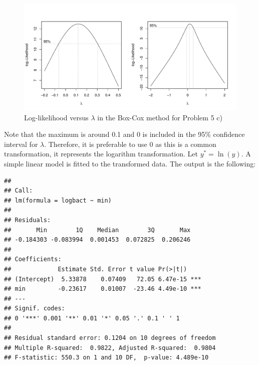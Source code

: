 \begin{solution}{2.22}
\begin{enumerate}
\begin{figure}
\begin{center}
\begin{knitrout}
\color{fgcolor}
\includegraphics[width=\maxwidth]{figure/unnamed-chunk-42-1}

\end{knitrout}
\end{center}
\caption{Log-likelihood versus $\lambda$ in the Box-Cox method for Problem 5 c)} \label{fig:simple:bact4}
\end{figure}

Note that the maximum is around 0.1 and 0 is included in the 95\% confidence interval for $\lambda$. Therefore, it is preferable to use 0 as this is a common transformation, it represents the logarithm transformation. Let $y^{*}=\ln(y)$. A simple linear model is fitted to the transformed data. The output is the following:
\begin{knitrout}
\color{fgcolor}\begin{kframe}
\begin{alltt}
 \hlkwb{<-} 
 \hlkwb{<-} \hlopt{~}
\end{alltt}
\begin{verbatim}
##
## Call:
## lm(formula = logbact ~ min)
##
## Residuals:
##       Min        1Q    Median        3Q       Max
## -0.184303 -0.083994  0.001453  0.072825  0.206246
##
## Coefficients:
##             Estimate Std. Error t value Pr(>|t|)
## (Intercept)  5.33878    0.07409   72.05 6.47e-15 ***
## min         -0.23617    0.01007  -23.46 4.49e-10 ***
## ---
## Signif. codes:
## 0 '***' 0.001 '**' 0.01 '*' 0.05 '.' 0.1 ' ' 1
##
## Residual standard error: 0.1204 on 10 degrees of freedom
## Multiple R-squared:  0.9822,	Adjusted R-squared:  0.9804
## F-statistic: 550.3 on 1 and 10 DF,  p-value: 4.489e-10
\end{verbatim}
\end{kframe}
\end{knitrout}


\end{enumerate}
\end{solution}
